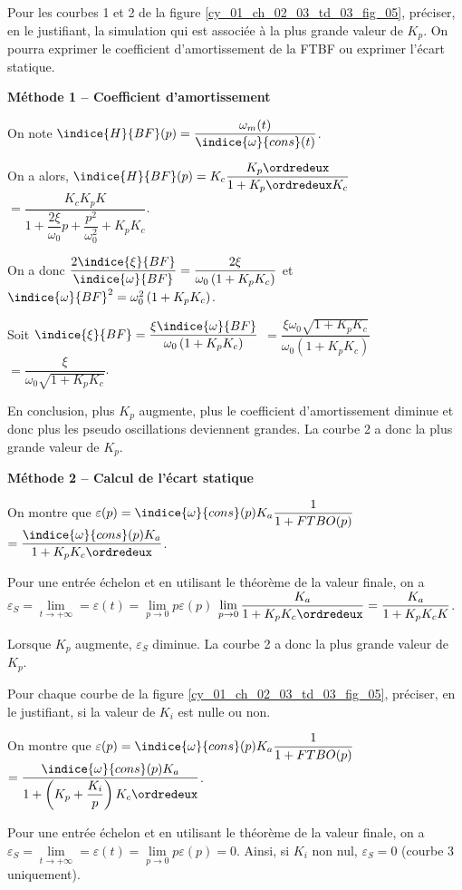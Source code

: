 \begin{question}
Pour les courbes 1 et 2 de la figure \ref{cy_01_ch_02_03_td_03_fig_05}, préciser, en le justifiant, la simulation qui est associée à la plus grande
valeur de $K_p$. On pourra exprimer le coefficient d'amortissement de la FTBF ou exprimer l'écart statique.
\end{question}
\ifprof
\begin{corrige}
\textbf{Méthode 1 -- Coefficient d'amortissement}

On note $\indice{H}{BF}(p) = \dfrac{\omega_m(t)}{\indice{\omega}{cons}(t)}$.


On a alors, $\indice{H}{BF}(p) = K_c \dfrac{K_p \ordredeux }{1+K_p \ordredeux  K_c}$
$=  \dfrac{K_cK_p K}{1+\dfrac{2\xi}{\omega_0}p+\dfrac{p^2}{\omega_0^2}+K_p K_c}$.

On a donc $\dfrac{2\indice{\xi}{BF}}{\indice{\omega}{BF}} = \dfrac{2\xi}{\omega_0\left(1+K_p K_c\right)}$
et $\indice{\omega}{BF}^2 = \omega_0^2 \left(1+K_p K_c\right)$.

Soit
$\indice{\xi}{BF} = \dfrac{\xi\indice{\omega}{BF}}{\omega_0\left(1+K_p K_c\right)}$ 
$= \dfrac{\xi\omega_0\sqrt{1+K_p K_c}}{\omega_0\left(1+K_p K_c\right)}$ 
$= \dfrac{\xi}{\omega_0\sqrt{1+K_p K_c}}$.

En conclusion, plus $K_p$ augmente, plus le coefficient d'amortissement diminue et donc plus les pseudo oscillations deviennent grandes. La courbe 2 a donc la plus grande valeur de $K_p$.

\textbf{Méthode 2 -- Calcul de l'écart statique}

On montre que $\varepsilon(p) = \indice{\omega}{cons}(p) K_a \dfrac{1}{1+FTBO(p)}$
$= \dfrac{\indice{\omega}{cons}(p) K_a}{1+K_p K_c\ordredeux }$.

Pour une entrée échelon et en utilisant le théorème de la valeur finale, on a 
$\varepsilon_S =  \lim\limits_{t\to +\infty} = \varepsilon(t) = \lim\limits_{p\to 0} p \varepsilon(p)$
$\lim\limits_{p\to 0} \dfrac{ K_a}{1+K_p K_c\ordredeux } = \dfrac{K_a}{1+K_p K_c K}$.

Lorsque $K_p$ augmente, $ \varepsilon_S$ diminue. La courbe 2 a donc la plus grande valeur de $K_p$.



\end{corrige}
\else
\fi

\begin{question}
Pour chaque courbe de la figure \ref{cy_01_ch_02_03_td_03_fig_05}, préciser, en le justifiant, si la valeur de $K_i$ est nulle ou non.
\end{question}
\ifprof
\begin{corrige}
On montre que $\varepsilon(p) = \indice{\omega}{cons}(p) K_a \dfrac{1}{1+FTBO(p)}$
$= \dfrac{\indice{\omega}{cons}(p) K_a}{1+\left( K_p + \dfrac{K_i}{p}\right) K_c\ordredeux }$.

Pour une entrée échelon et en utilisant le théorème de la valeur finale, on a 
$\varepsilon_S =  \lim\limits_{t\to +\infty} = \varepsilon(t) = \lim\limits_{p\to 0} p \varepsilon(p) = 0$.
Ainsi, si $K_i$ non nul, $\varepsilon_S  =0$ (courbe 3 uniquement).

\end{corrige}
\else
\fi




